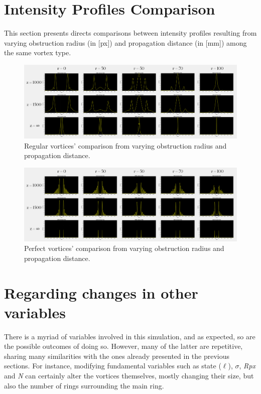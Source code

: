 \newpage
\section{Intensity Profiles Comparison}
This section presents directs comparisons between intensity profiles resulting from varying obstruction radius (in [px]) and propagation distance (in [mm]) among the same vortex type.

\begin{figure}[htbp]
    \centering
    \includegraphics[width=15cm]{images/c04/Regular_Vortices-z_vs_r.png}
    \caption{Regular vortices' comparison from varying obstruction radius and propagation distance.}
    \label{fig:regular_r_vs_z}
\end{figure}

\begin{figure}[htbp]
    \centering
    \includegraphics[width=15cm]{images/c04/Perfect_Vortices-z_vs_r.png}
    \caption{Perfect vortices' comparison from varying obstruction radius and propagation distance.}
    \label{fig:regular_r_vs_z}
\end{figure}


\newpage
\section{Regarding changes in other variables}
\label{c4:other arguments variations}

There is a myriad of variables involved in this simulation, and as expected, so are the possible outcomes of doing so. However, many of the latter are repetitive, sharing many similarities with the ones already presented in the previous sections. For instance, modifying fundamental variables such as state ($\ell$), $\sigma$, \textit{Rpx} and \textit{N} can certainly alter the vortices themselves, mostly changing their size, but also the number of rings surrounding the main ring.

